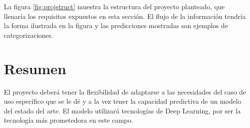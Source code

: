 La figura \ref{fig:projstruct} muestra la estructura del proyecto planteado, que llenaría los requisitos expuestos en esta sección. El flujo de la información tendría la forma ilustrada en la figura y las predicciones mostradas son ejemplos de categorizaciones.

\section{Resumen}

El proyecto deberá tener la flexibilidad de adaptarse a las necesidades del caso de uso específico que se le dé y a la vez tener la capacidad predictiva de un modelo del estado del arte. El modelo utilizará tecnologías de Deep Learning, por ser la tecnología más prometedora en este campo.





